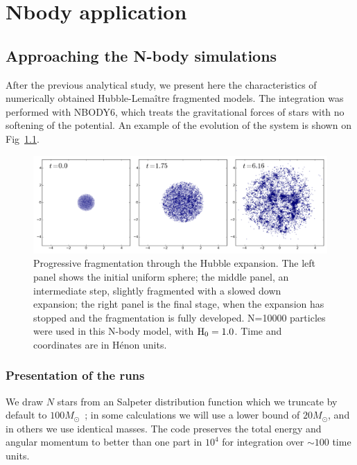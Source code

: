 

\chapter{Nbody application}

\section{Approaching the N-body simulations}

After the previous analytical study, we present here the characteristics of  numerically obtained Hubble-Lema\^itre fragmented models. The integration was performed with NBODY6, which treats the gravitational forces of stars with no softening of the potential. An example of the evolution of the system is shown on Fig~\ref{Fig:2_fragmentation}. 



\begin{figure}[h]
\begin{center}
\includegraphics[width=\textwidth]{Figures/2_fragmentation}
\caption{Progressive fragmentation through the Hubble expansion. The left panel shows the initial uniform sphere; the middle panel, an intermediate step, slightly fragmented with a slowed down expansion; the right panel is the final stage, when the expansion has stopped and the fragmentation is fully developed. N=10000 particles were used in this N-body model, with ${\textrm{H}}_0 = 1.0$. Time and coordinates are in H\'enon units.}
\label{Fig:2_fragmentation}
\end{center}
\end{figure}

\subsection{Presentation of the runs}

We draw $N$ stars from an Salpeter distribution function which we truncate by default to $100 M_\odot$~; in some calculations we will  use a lower bound of $20 M_\odot$, and in others we use identical masses. The code preserves the total energy and angular momentum to better than one part in $10^4$ for integration over $\sim 100 $ time units.  

